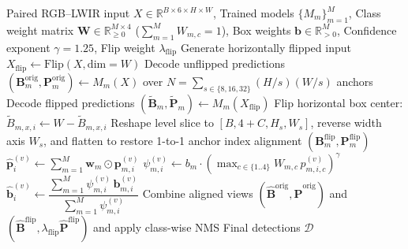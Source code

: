 \documentclass[journal,twoside,web]{ieeecolor}
\begin{document}
\begin{algorithm}[t]
\caption{2D-Grid Anchor-Aligned Confidence-Weighted Regression (\texttt{CWAR}) \& Class-Specific Fusion (\texttt{MACAF})}
\label{alg:cwar_macaf}
\begin{algorithmic}[1]
\REQUIRE Paired RGB--LWIR input $X \in \mathbb{R}^{B \times 6 \times H \times W}$, Trained models $\{M_m\}_{m=1}^M$, Class weight matrix $\mathbf{W} \in \mathbb{R}_{\ge 0}^{M \times 4}$ ($\sum_{m=1}^M W_{m,c}=1$), Box weights $\mathbf{b} \in \mathbb{R}_{>0}^M$, Confidence exponent $\gamma = 1.25$, Flip weight $\lambda_{\text{flip}}$
\STATE Generate horizontally flipped input $X_{\text{flip}} \leftarrow \mathrm{Flip}(X, \text{dim}=W)$
    \STATE Decode unflipped predictions $(\mathbf{B}_m^{\text{orig}}, \mathbf{P}_m^{\text{orig}}) \leftarrow M_m(X)$ over $N = \sum_{s\in\{8,16,32\}} (H/s)(W/s)$ anchors
    \STATE Decode flipped predictions $(\tilde{\mathbf{B}}_m, \tilde{\mathbf{P}}_m) \leftarrow M_m(X_{\text{flip}})$
    \STATE Flip horizontal box center: $\tilde{B}_{m,x,i} \leftarrow W - \tilde{B}_{m,x,i}$
        \STATE Reshape level slice to $[B, 4+C, H_s, W_s]$, reverse width axis $W_s$, and flatten to restore 1-to-1 anchor index alignment $(\mathbf{B}_m^{\text{flip}}, \mathbf{P}_m^{\text{flip}})$
    \ENDFOR
\ENDFOR
{}
    \STATE $\hat{\mathbf{p}}_i^{(v)} \leftarrow \sum_{m=1}^M \mathbf{w}_m \odot \mathbf{p}_{m,i}^{(v)}$ 
    \STATE $\psi_{m,i}^{(v)} \leftarrow b_m \cdot \left(\max_{c \in \{1..4\}} W_{m,c}\, p_{m,i,c}^{(v)}\right)^\gamma$ 
    \STATE $\hat{\mathbf{b}}_i^{(v)} \leftarrow \dfrac{\sum_{m=1}^M \psi_{m,i}^{(v)}\, \mathbf{b}_{m,i}^{(v)}}{\sum_{m=1}^M \psi_{m,i}^{(v)}}$ 
\ENDFOR
\STATE Combine aligned views $(\hat{\mathbf{B}}^{\text{orig}}, \hat{\mathbf{P}}^{\text{orig}})$ and $(\hat{\mathbf{B}}^{\text{flip}}, \lambda_{\text{flip}}\hat{\mathbf{P}}^{\text{flip}})$ and apply class-wise NMS
\RETURN Final detections $\mathcal{D}$
\end{algorithmic}
\end{algorithm}
\end{document}
